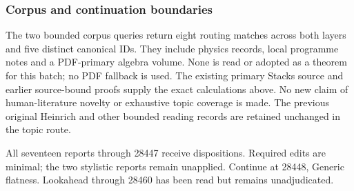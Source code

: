 \subsubsection{Corpus and continuation boundaries}\label{corpus-and-continuation-boundaries}

The two bounded corpus queries return eight routing matches across both layers and five distinct canonical IDs. They include physics records, local programme notes and a PDF-primary algebra volume. None is read or adopted as a theorem for this batch; no PDF fallback is used. The existing primary Stacks source and earlier source-bound proofs supply the exact calculations above. No new claim of human-literature novelty or exhaustive topic coverage is made. The previous original Heinrich and other bounded reading records are retained unchanged in the topic route.

All seventeen reports through 28447 receive dispositions. Required edits are minimal; the two stylistic reports remain unapplied. Continue at 28448, Generic flatness. Lookahead through 28460 has been read but remains unadjudicated.
